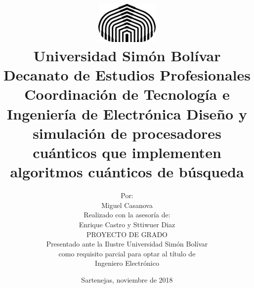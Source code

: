 \begin{titlepage}
    \title{\vspace{-2cm} \includegraphics[width=1.2in]{./usb.png} \\[.2cm]
        \large Universidad Simón Bolívar \\
        Decanato de Estudios Profesionales \\
        Coordinación de Tecnología e Ingeniería de Electrónica
        \vfill \LARGE Diseño y simulación de procesadores cuánticos que implementen algoritmos cuánticos de búsqueda \vfill}
    \author{Por: \\
        Miguel Casanova \\
        Realizado con la asesoría de: \\
        Enrique Castro y Sttiwuer Diaz \\[1.2cm]
        PROYECTO DE GRADO \\
Presentado ante la Ilustre Universidad Simón Bolívar \\
como requisito parcial para optar al título de \\
Ingeniero Electrónico}
    \date{Sartenejas, noviembre de 2018}
\end{titlepage}
